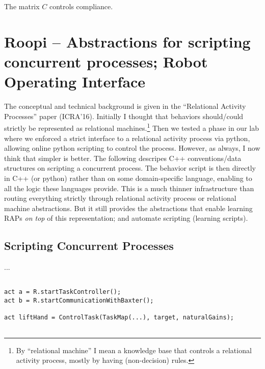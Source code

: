 \documentclass[10pt,fleqn,twoside]{article}
\begin{document}
{{\begin{description}
The matrix $C$ controls compliance.



\item[Measured-force limits]

\item[Limit Energy]

\end{description}


\section{Roopi -- Abstractions for scripting concurrent processes;
  Robot Operating Interface}

The conceptual and technical background is given in the "`Relational
Activity Processes"' paper (ICRA'16). Initially I thought that
behaviors should/could strictly be represented as relational
machines.\footnote{By ``relational machine'' I mean a knowledge base
  that controls a relational activity process, mostly by having
  (non-decision) rules.} Then we tested a phase in our lab where we
enforced a strict interface to a relational activity process via
python, allowing online python scripting to control the
process. However, as always, I now think that simpler is better. The
following descripes C++ conventions/data structures on scripting a
concurrent process. The behavior script is then directly in C++ (or
python) rather than on some domain-specific language, enabling to
all the logic these languages provide. This is a much thinner
infrastructure than routing everything strictly through relational
activity process or relational machine abstractions. But it still
provides the abstractions that enable learning RAPs \emph{on top} of
this representation; and automate scripting (learning scripts).

\subsection{Scripting Concurrent Processes}

...

\begin{code}
\begin{verbatim}

act a = R.startTaskController();
act b = R.startCommunicationWithBaxter();

act liftHand = ControlTask(TaskMap(...), target, naturalGains);


\end{verbatim}
\end{code}}}
\end{document}
